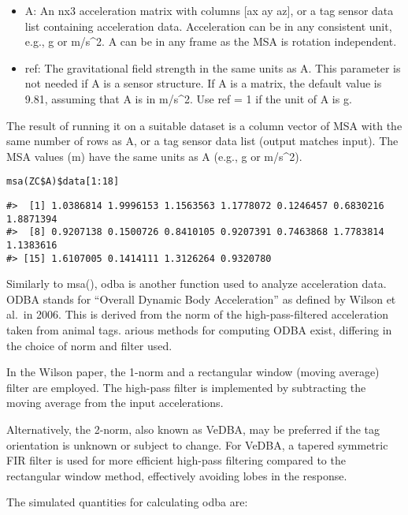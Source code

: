 \begin{itemize}
\item
  A: An nx3 acceleration matrix with columns {[}ax ay az{]}, or a tag sensor data list containing acceleration data. Acceleration can be in any consistent unit, e.g., g or m/s\^{}2. A can be in any frame as the MSA is rotation independent.
\item
  ref: The gravitational field strength in the same units as A. This parameter is not needed if A is a sensor structure. If A is a matrix, the default value is 9.81, assuming that A is in m/s\^{}2. Use ref = 1 if the unit of A is g.
\end{itemize}

The result of running it on a suitable dataset is a column vector of MSA with the same number of rows as A, or a tag sensor data list (output matches input). The MSA values (m) have the same units as A (e.g., g or m/s\^{}2).

\begin{verbatim}
msa(ZC$A)$data[1:18]
\end{verbatim}

\begin{verbatim}
#>  [1] 1.0386814 1.9996153 1.1563563 1.1778072 0.1246457 0.6830216 1.8871394
#>  [8] 0.9207138 0.1500726 0.8410105 0.9207391 0.7463868 1.7783814 1.1383616
#> [15] 1.6107005 0.1414111 1.3126264 0.9320780
\end{verbatim}

Similarly to msa(), odba is another function used to analyze acceleration data. ODBA stands for ``Overall Dynamic Body Acceleration'' as defined by Wilson et al.~in 2006. This is derived from the norm of the high-pass-filtered acceleration taken from animal tags. arious methods for computing ODBA exist, differing in the choice of norm and filter used.

In the Wilson paper, the 1-norm and a rectangular window (moving average) filter are employed. The high-pass filter is implemented by subtracting the moving average from the input accelerations.

Alternatively, the 2-norm, also known as VeDBA, may be preferred if the tag orientation is unknown or subject to change. For VeDBA, a tapered symmetric FIR filter is used for more efficient high-pass filtering compared to the rectangular window method, effectively avoiding lobes in the response.

The simulated quantities for calculating odba are:

